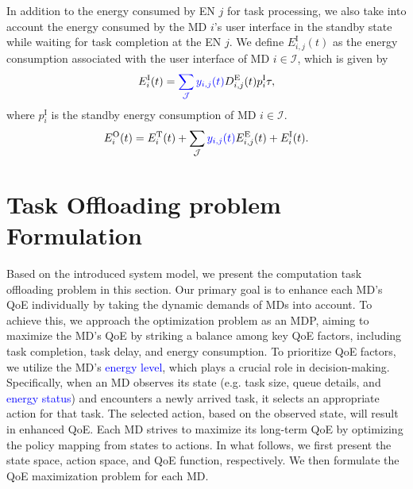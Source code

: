 \documentclass[10pt, journal,letterpaper]{IEEEtran}
\begin{document}
In addition to the energy consumed by EN $j$ for task processing, we also take into account the energy consumed by the MD $i$'s user interface in the standby state while waiting for task completion at the EN $j$. We define $E_{i,j}^{\text{I}}(t)$ as the energy consumption associated with the user interface of MD $i \in \mathcal{I}$, which is given by
\begin{alignat}{1}
	E_i^{\text{I}}(t) = \textcolor{blue}{\sum_{\mathcal{J}} y_{i,j}(t)} D_{i,j}^{\text{E}}(t) p_i^{\text{I}} \tau, %
	\label{16}
\end{alignat}
where $p_i^{\text{I}}$ is the standby energy consumption of MD $i \in \mathcal{I}$.
\begin{alignat}{1}
	E_i^{\text{O}}(t) = E_i^{\text{T}}(t) + \sum_{\mathcal{J}} \textcolor{blue}{y_{i,j}(t)} E_{i,j}^{\text{E}}(t) + E_i^{\text{I}}(t).
	\label{17}
\end{alignat}



\section{Task Offloading problem Formulation}
\label{section:IV}

Based on the introduced system model, we present the computation task offloading problem in this section. Our primary goal is to enhance each MD's QoE individually by taking the dynamic demands of MDs into account. To achieve this, we approach the optimization problem as an MDP, aiming to maximize the MD's QoE by striking a balance among key QoE factors, including task completion, task delay, and energy consumption. To prioritize QoE factors, we utilize the MD's \textcolor{blue}{energy level}, which plays a crucial role in decision-making. Specifically, when an MD observes its state (e.g. task size, queue details, and \textcolor{blue}{energy status}) and encounters a newly arrived task, it selects an appropriate action for that task. The selected action, based on the observed state, will result in enhanced QoE. Each MD strives to maximize its long-term QoE by optimizing the policy mapping from states to actions. In what follows, we first present the state space, action space, and QoE function, respectively. We then formulate the QoE maximization problem for each MD.
\end{document}
